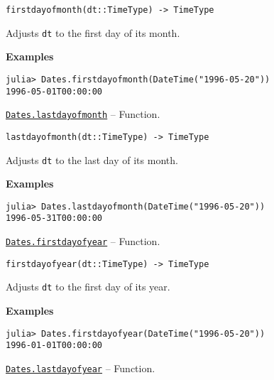 \begin{adjustwidth}{2em}{0pt}


\begin{verbatim}
firstdayofmonth(dt::TimeType) -> TimeType
\end{verbatim}

Adjusts \texttt{dt} to the first day of its month.

\textbf{Examples}


\begin{verbatim}
julia> Dates.firstdayofmonth(DateTime("1996-05-20"))
1996-05-01T00:00:00
\end{verbatim}



\end{adjustwidth}
\hypertarget{14220689943148611628}{} 
\hyperlink{14220689943148611628}{\texttt{Dates.lastdayofmonth}}  -- {Function.}

\begin{adjustwidth}{2em}{0pt}


\begin{verbatim}
lastdayofmonth(dt::TimeType) -> TimeType
\end{verbatim}

Adjusts \texttt{dt} to the last day of its month.

\textbf{Examples}


\begin{verbatim}
julia> Dates.lastdayofmonth(DateTime("1996-05-20"))
1996-05-31T00:00:00
\end{verbatim}



\end{adjustwidth}
\hypertarget{16489505143268736660}{} 
\hyperlink{16489505143268736660}{\texttt{Dates.firstdayofyear}}  -- {Function.}

\begin{adjustwidth}{2em}{0pt}


\begin{verbatim}
firstdayofyear(dt::TimeType) -> TimeType
\end{verbatim}

Adjusts \texttt{dt} to the first day of its year.

\textbf{Examples}


\begin{verbatim}
julia> Dates.firstdayofyear(DateTime("1996-05-20"))
1996-01-01T00:00:00
\end{verbatim}



\end{adjustwidth}
\hypertarget{10580858002556506121}{} 
\hyperlink{10580858002556506121}{\texttt{Dates.lastdayofyear}}  -- {Function.}

